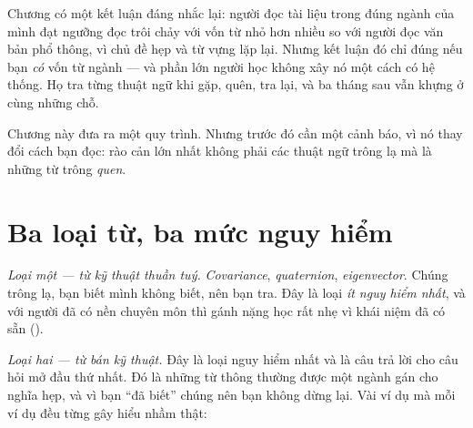 \documentclass[../../english.tex]{subfiles}
\begin{document}
Chương  có một kết luận đáng nhắc lại: người đọc tài liệu trong đúng ngành của mình đạt ngưỡng đọc trôi chảy với vốn từ nhỏ hơn nhiều\cite{nation2013} so với người đọc văn bản phổ thông, vì chủ đề hẹp và từ vựng lặp lại. Nhưng kết luận đó chỉ đúng nếu bạn \emph{có} vốn từ ngành --- và phần lớn người học không xây nó một cách có hệ thống. Họ tra từng thuật ngữ khi gặp, quên, tra lại, và ba tháng sau vẫn khựng ở cùng những chỗ.

Chương này đưa ra một quy trình. Nhưng trước đó cần một cảnh báo, vì nó thay đổi cách bạn đọc: rào cản lớn nhất không phải các thuật ngữ trông lạ mà là những từ trông \emph{quen}.

\section{Ba loại từ, ba mức nguy hiểm}

\emph{Loại một --- từ kỹ thuật thuần tuý.} \emph{Covariance}, \emph{quaternion}, \emph{eigenvector}. Chúng trông lạ, bạn biết mình không biết, nên bạn tra. Đây là loại \emph{ít nguy hiểm nhất}, và với người đã có nền chuyên môn thì gánh nặng học rất nhẹ vì khái niệm đã có sẵn ().

\emph{Loại hai --- từ bán kỹ thuật.} Đây là loại nguy hiểm nhất và là câu trả lời cho câu hỏi mở đầu thứ nhất. Đó là những từ thông thường được một ngành gán cho nghĩa hẹp, và vì bạn ``đã biết'' chúng nên bạn không dừng lại. Vài ví dụ mà mỗi ví dụ đều từng gây hiểu nhầm thật:

\begin{tuvung}
\end{tuvung}
\end{document}
